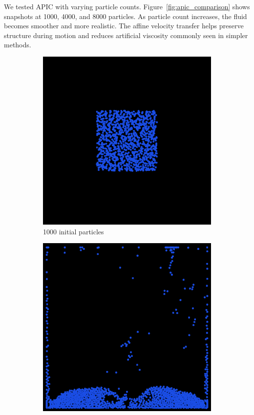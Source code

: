 We tested APIC with varying particle counts. Figure~\ref{fig:apic_comparison} shows snapshots at 1000, 4000, and 8000 particles. As particle count increases, the fluid becomes smoother and more realistic. The affine velocity transfer helps preserve structure during motion and reduces artificial viscosity commonly seen in simpler methods.
\begin{figure}[h]
    \centering
    \begin{subfigure}[b]{0.2\textwidth}
        \includegraphics[width=\textwidth]{figures/apic1000_init.png}
        \caption{1000 initial particles}
    \end{subfigure}
    \hspace{1em}
    \begin{subfigure}[b]{0.2\textwidth}
        \includegraphics[width=\textwidth]{figures/apic1000.png}

\end{subfigure}
\end{figure}

